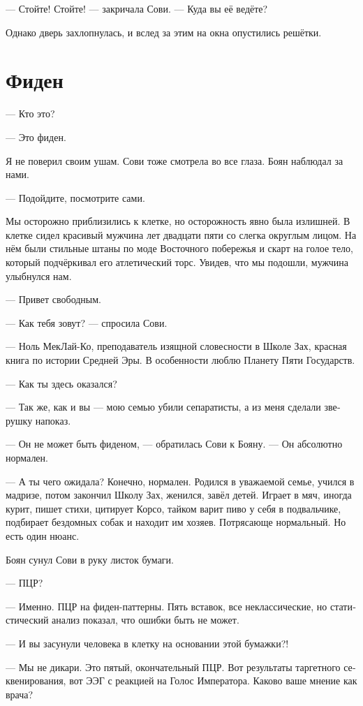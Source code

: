 \documentclass[a4paper,12pt,fleqn]{book}\usepackage{polyglossia}\setdefaultlanguage[babelshorthands=true]{russian}\setotherlanguage{english}\defaultfontfeatures{Ligatures=TeX,Mapping=tex-text}
\begin{document}
--- Стойте!
Стойте! --- закричала Сови.
--- Куда вы её ведёте?

Однако дверь захлопнулась, и вслед за этим на окна опустились решётки.

\section{Фиден}

--- Кто это?

--- Это фиден.

Я не поверил своим ушам.
Сови тоже смотрела во все глаза.
Боян наблюдал за нами.

--- Подойдите, посмотрите сами.

Мы осторожно приблизились к клетке, но осторожность явно была излишней.
В клетке сидел красивый мужчина лет двадцати пяти со слегка округлым лицом.
На нём были стильные штаны по моде Восточного побережья и скарт на голое тело, который подчёркивал его атлетический торс.
Увидев, что мы подошли, мужчина улыбнулся нам.

--- Привет свободным.

--- Как тебя зовут? --- спросила Сови.

--- Ноль МекЛай-Ко, преподаватель изящной словесности в Школе Зах, красная книга по истории Средней Эры.
В особенности люблю Планету Пяти Государств.

--- Как ты здесь оказался?

--- Так же, как и вы --- мою семью убили сепаратисты, а из меня сделали зверушку напоказ.

--- Он не может быть фиденом, --- обратилась Сови к Бояну.
--- Он абсолютно нормален.

--- А ты чего ожидала?
Конечно, нормален.
Родился в уважаемой семье, учился в мадризе, потом закончил Школу Зах, женился, завёл детей.
Играет в мяч, иногда курит, пишет стихи, цитирует Корсо, тайком варит пиво у себя в подвальчике, подбирает бездомных собак и находит им хозяев.
Потрясающе нормальный.
Но есть один нюанс.

Боян сунул Сови в руку листок бумаги.

--- ПЦР?

--- Именно.
ПЦР на фиден-паттерны.
Пять вставок, все неклассические, но статистический анализ показал, что ошибки быть не может.

--- И вы засунули человека в клетку на основании этой бумажки?!

--- Мы не дикари.
Это пятый, окончательный ПЦР.
Вот результаты таргетного секвенирования, вот ЭЭГ с реакцией на Голос Императора.
Каково ваше мнение как врача?
\end{document}
